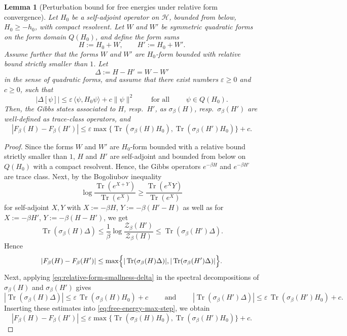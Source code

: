 \documentclass[11pt]{amsart}
\newcommand{\1}{\mathbbm{1}}
\newcommand{\Tr}{\operatorname{Tr}}
\theoremstyle{plain}
\newtheorem{lemma}[theorem]{Lemma}
\theoremstyle{definition}
\theoremstyle{remark}
\numberwithin{equation}{section}
\begin{document}
\begin{lemma}[Perturbation bound for free energies under relative form convergence]
\label{lem:free-energy-relative-form-convergence}
 Let \(H_{0}\) be a self-adjoint operator on \(\mathcal H\), bounded from below, $H_0\ge -h_0$, with compact resolvent. Let \(W\) and \(W'\) be symmetric quadratic forms on the form domain \(Q(H_{0})\), and define the form sums
\[
H:=H_{0}+ W,
\qquad
H':=H_{0}+ W'.
\]
Assume further that the forms \(W\) and \(W'\) are \(H_{0}\)-form bounded with relative bound strictly smaller than \(1\). Let
\begin{equation}
\label{eq:DeltaNM}
\Delta:=H-H'=W-W'
\end{equation}
in the sense of quadratic forms, and assume that there exist numbers \(\varepsilon\ge0\) and \(c\ge0\), such that
\begin{equation}
\label{eq:relative-form-smallness-delta}
|\Delta[\psi]|
\le
\varepsilon \,\langle \psi,H_{0}\psi\rangle + c\|\psi\|^2
\qquad\text{ for all }\qquad \psi\in Q(H_{0}).
\end{equation}
Then, the Gibbs states associated to $H$, resp.~$H'$, as $\sigma_\beta(H)$, resp.~$\sigma_\beta(H')$ are well-defined as trace-class operators, and
\begin{equation}
\label{eq:sharper-max-estimate}
|F_\beta(H)-F_\beta(H')|
\le
{\varepsilon}
\max\bigl\{\Tr(\sigma_\beta(H) H_{0}),\Tr(\sigma_\beta(H')H_{0})\bigr\}
+{c}.
\end{equation}
\end{lemma}

\begin{proof}

Since the forms \(W\) and \(W'\) are \(H_{0}\)-form bounded with a relative bound strictly smaller than \(1\), \(H\) and \(H'\) are self-adjoint and bounded from below on \(Q(H_{0})\) with a compact resolvent. Hence, the Gibbs operators \(e^{-\beta H}\) and \(e^{-\beta H'}\) are trace class. Next, by the Bogoliubov inequality \cite{Dereziski2003}
\begin{equation}
\label{eq:PB}
\log \frac{\Tr(e^{X+Y})}{\Tr(e^{X})}
\ge
\frac{\Tr(e^{X}Y)}{\Tr(e^{X})}
\end{equation}
for self-adjoint \(X,Y\) with $X:=-\beta H$, $Y:=-\beta(H'-H)$ as well as for $X:=-\beta H'$, $Y:=-\beta(H-H')$, we get 
\[
\Tr(\sigma_\beta(H)\Delta)
\le \frac1\beta\log\frac{\mathcal{Z}_\beta(H')}{\mathcal{Z}_\beta(H)}
\le \Tr(\sigma_\beta(H')\Delta).
\]
Hence
\begin{equation}
\label{eq:free-energy-max-step}
|F_\beta(H)-F_{\beta}(H')|
\le
\max\Bigl\{
|\Tr(\sigma_\beta(H)\Delta)|,
|\Tr(\sigma_\beta(H')\Delta)|
\Bigr\}.
\end{equation}
Next, applying \eqref{eq:relative-form-smallness-delta} in the spectral decompositions of \(\sigma_\beta(H)\) and \(\sigma_\beta(H')\) gives
\[
|\Tr(\sigma_\beta(H)\Delta)|
\le \varepsilon\,\Tr(\sigma_\beta(H)H_{0})+c\qquad \text{ and }\qquad 
|\Tr(\sigma_\beta(H')\Delta)|
\le \varepsilon\,\Tr(\sigma_\beta(H')H_{0})+c.
\]
Inserting these estimates into \eqref{eq:free-energy-max-step}, we obtain
\[
|F_\beta(H)-F_\beta(H')|
\le
{\varepsilon}
\max\bigl\{\Tr(\sigma_\beta(H)H_{0}),\Tr(\sigma_\beta(H')H_{0})\bigr\}
+c.
\]
\end{proof}
\end{document}
